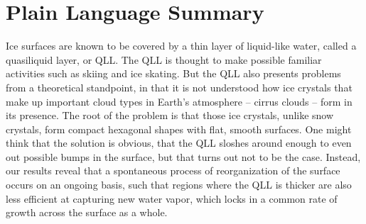 \documentclass[draft]{agujournal2019}
\begin{document}
%
%


\begin{abstract}
We explore the hypothesis that a key factor in the growth and ablation dynamics of faceted ice crystals is the quasiliquid layer that forms at the ice-vapor interface. We do so by modifying a previous formulation, a pair of micrometer-scale reaction-diffusion equations, to contain an explicit timescale of quasiliquid freezing and melting. We also use ice surface topology information derived from cryoscopic scanning electron microscopy experiments, as well as numerical simulations of vapor concentrations around ice crystals, to constrain parameters of the new formulation. The resulting picture is a robust nonlinear-dynamical mechanism for faceted growth and ablation, reminiscent of Turing's theory of spontaneous pattern formation, involving a limit cycle for the thickness of the quasiliquid layer and a traveling wave for the underlying ice.
\end{abstract}

\section*{Plain Language Summary}
Ice surfaces are known to be covered by a thin layer of liquid-like water, called a quasiliquid layer, or QLL. The QLL is thought to make possible familiar activities such as skiing and ice skating. But the QLL also presents problems from a theoretical standpoint, in that it is not understood how ice crystals that make up important cloud types in Earth's atmosphere -- cirrus clouds -- form in its presence. The root of the problem is that those ice crystals, unlike snow crystals, form compact hexagonal shapes with flat, smooth surfaces. One might think that the solution is obvious, that the QLL sloshes around enough to even out possible bumps in the surface, but that turns out not to be the case. Instead, our results reveal that a spontaneous process of reorganization of the surface occurs on an ongoing basis, such that regions where the QLL is thicker are also less efficient at capturing new water vapor, which locks in a common rate of growth across the surface as a whole.
\end{document}
